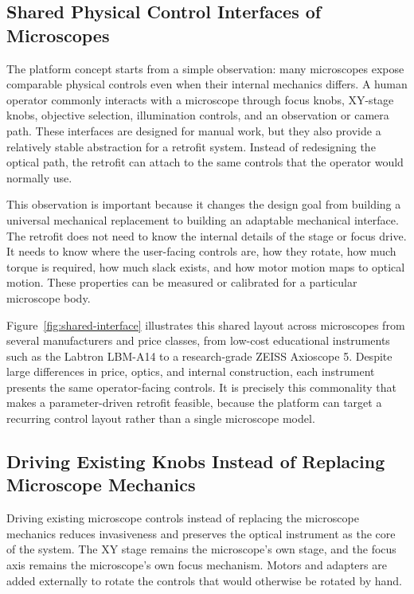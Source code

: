 \subsection{Shared Physical Control Interfaces of Microscopes}

The platform concept starts from a simple observation: many microscopes expose comparable physical controls even when their internal mechanics differs. A human operator commonly interacts with a microscope through focus knobs, XY-stage knobs, objective selection, illumination controls, and an observation or camera path. These interfaces are designed for manual work, but they also provide a relatively stable abstraction for a retrofit system. Instead of redesigning the optical path, the retrofit can attach to the same controls that the operator would normally use.



This observation is important because it changes the design goal from building a universal mechanical replacement to building an adaptable mechanical interface. The retrofit does not need to know the internal details of the stage or focus drive. It needs to know where the user-facing controls are, how they rotate, how much torque is required, how much slack exists, and how motor motion maps to optical motion. These properties can be measured or calibrated for a particular microscope body.

Figure~\ref{fig:shared-interface} illustrates this shared layout across microscopes from several manufacturers and price classes, from low-cost educational instruments such as the Labtron LBM-A14 to a research-grade ZEISS Axioscope 5. Despite large differences in price, optics, and internal construction, each instrument presents the same operator-facing controls. It is precisely this commonality that makes a parameter-driven retrofit feasible, because the platform can target a recurring control layout rather than a single microscope model.

\subsection{Driving Existing Knobs Instead of Replacing Microscope Mechanics}

Driving existing microscope controls instead of replacing the microscope mechanics reduces invasiveness and preserves the optical instrument as the core of the system. The XY stage remains the microscope's own stage, and the focus axis remains the microscope's own focus mechanism. Motors and adapters are added externally to rotate the controls that would otherwise be rotated by hand.

